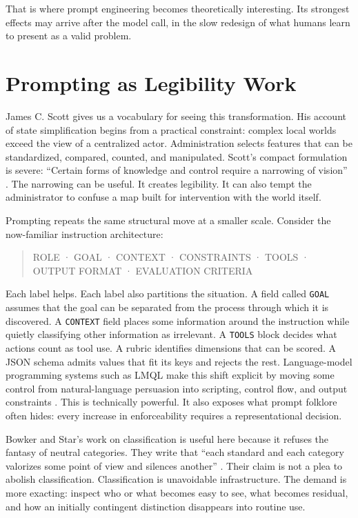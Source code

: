 \documentclass[11pt]{article}
\begin{document}
That is where prompt engineering becomes theoretically interesting. Its strongest effects may arrive after the model call, in the slow redesign of what humans learn to present as a valid problem.

\section{Prompting as Legibility Work}

James C. Scott gives us a vocabulary for seeing this transformation. His account of state simplification begins from a practical constraint: complex local worlds exceed the view of a centralized actor. Administration selects features that can be standardized, compared, counted, and manipulated. Scott's compact formulation is severe: ``Certain forms of knowledge and control require a narrowing of vision'' \citep{scott1998seeing}. The narrowing can be useful. It creates legibility. It can also tempt the administrator to confuse a map built for intervention with the world itself.

Prompting repeats the same structural move at a smaller scale. Consider the now-familiar instruction architecture:

\begin{quote}
ROLE · GOAL · CONTEXT · CONSTRAINTS · TOOLS · OUTPUT FORMAT · EVALUATION CRITERIA
\end{quote}

Each label helps. Each label also partitions the situation. A field called \texttt{GOAL} assumes that the goal can be separated from the process through which it is discovered. A \texttt{CONTEXT} field places some information around the instruction while quietly classifying other information as irrelevant. A \texttt{TOOLS} block decides what actions count as tool use. A rubric identifies dimensions that can be scored. A JSON schema admits values that fit its keys and rejects the rest. Language-model programming systems such as LMQL make this shift explicit by moving some control from natural-language persuasion into scripting, control flow, and output constraints \citep{beurerkellner2023lmql}. This is technically powerful. It also exposes what prompt folklore often hides: every increase in enforceability requires a representational decision.

Bowker and Star's work on classification is useful here because it refuses the fantasy of neutral categories. They write that ``each standard and each category valorizes some point of view and silences another'' \citep{bowkerstar1999sorting}. Their claim is not a plea to abolish classification. Classification is unavoidable infrastructure. The demand is more exacting: inspect who or what becomes easy to see, what becomes residual, and how an initially contingent distinction disappears into routine use.
\end{document}
